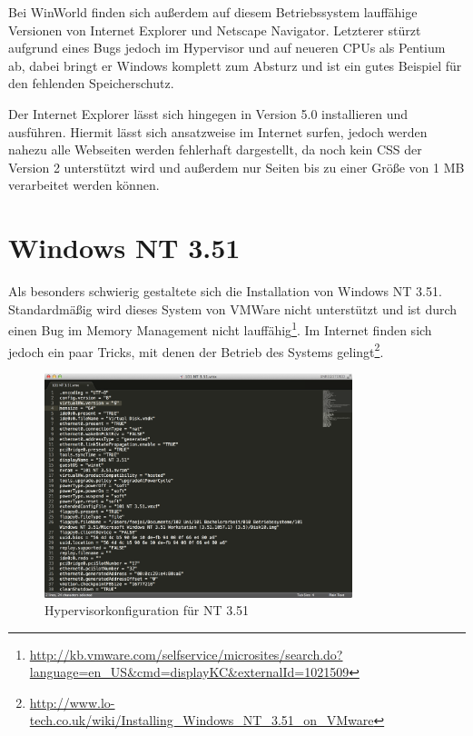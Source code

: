 	Bei WinWorld finden sich außerdem auf diesem Betriebssystem lauffähige Versionen von Internet Explorer und Netscape Navigator.
	Letzterer stürzt aufgrund eines Bugs jedoch im Hypervisor und auf neueren CPUs als Pentium ab, dabei bringt er Windows komplett zum Absturz und ist ein gutes Beispiel für den fehlenden Speicherschutz.

	Der Internet Explorer lässt sich hingegen in Version 5.0 installieren und ausführen. 
	Hiermit lässt sich ansatzweise im Internet surfen, jedoch werden nahezu alle Webseiten werden fehlerhaft dargestellt, da noch kein CSS der Version 2 unterstützt wird und außerdem nur Seiten bis zu einer Größe von 1 MB verarbeitet werden können. \\



\section{Windows NT 3.51}

	Als besonders schwierig gestaltete sich die Installation von Windows NT 3.51. 
	Standardmäßig wird dieses System von VMWare nicht unterstützt und ist durch einen Bug im Memory Management nicht lauffähig\footnote{\url{http://kb.vmware.com/selfservice/microsites/search.do?language=en_US&cmd=displayKC&externalId=1021509}}.
	Im Internet finden sich jedoch ein paar Tricks, mit denen der Betrieb des Systems gelingt\footnote{\url{http://www.lo-tech.co.uk/wiki/Installing_Windows_NT_3.51_on_VMware}}.

	\begin{figure}[h]
		\begin{center}
			\includegraphics[width=0.8\textwidth]{img/351vmx}
			\caption{Hypervisorkonfiguration für NT 3.51}
			\label{fig:screenshot-351vmx}
		\end{center}
	\end{figure}

